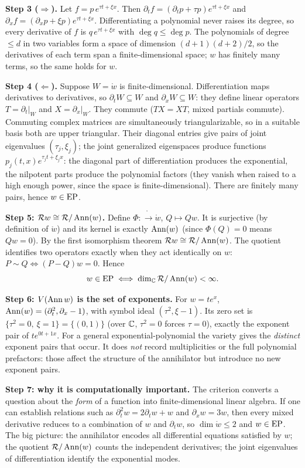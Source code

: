 \medskip\textbf{Step 3 ($\Rightarrow$).} Let $f=p\,e^{\tau t+\xi x}$. Then $\partial_tf=(\partial_tp+\tau p)e^{\tau t+\xi x}$ and $\partial_xf=(\partial_xp+\xi p)e^{\tau t+\xi x}$. Differentiating a polynomial never raises its degree, so every derivative of $f$ is $q\,e^{\tau t+\xi x}$ with $\deg q\le\deg p$. The polynomials of degree $\le d$ in two variables form a space of dimension $(d+1)(d+2)/2$, so the derivatives of each term span a finite-dimensional space; $w$ has finitely many terms, so the same holds for $w$.

\medskip\textbf{Step 4 ($\Leftarrow$).} Suppose $W=\ring w$ is finite-dimensional. Differentiation maps derivatives to derivatives, so $\partial_tW\subseteq W$ and $\partial_xW\subseteq W$: they define linear operators $T=\partial_t|_W$ and $X=\partial_x|_W$. They commute ($TX=XT$, mixed partials commute). Commuting complex matrices are simultaneously triangularizable, so in a suitable basis both are upper triangular. Their diagonal entries give pairs of joint eigenvalues $(\tau_j,\xi_j)$; the joint generalized eigenspaces produce functions $p_j(t,x)e^{\tau_jt+\xi_jx}$: the diagonal part of differentiation produces the exponential, the nilpotent parts produce the polynomial factors (they vanish when raised to a high enough power, since the space is finite-dimensional). There are finitely many pairs, hence $w\in\mathrm{EP}$.

\medskip\textbf{Step 5: $\mathcal{R} w\cong\mathcal{R}/\operatorname{Ann}(w)$.} Define $\Phi:\ring\to\ring w$, $Q\mapsto Qw$. It is surjective (by definition of $\ring w$) and its kernel is exactly $\operatorname{Ann}(w)$ (since $\Phi(Q)=0$ means $Qw=0$). By the first isomorphism theorem $\mathcal{R} w\cong\mathcal{R}/\operatorname{Ann}(w)$. The quotient identifies two operators exactly when they act identically on $w$: $P\sim Q\iff(P-Q)w=0$. Hence
\[
w\in\mathrm{EP}\iff\dim_{\mathbb{C}}\mathcal{R}/\operatorname{Ann}(w)<\infty .
\]

\medskip\textbf{Step 6: $V(\operatorname{Ann} w)$ is the set of exponents.} For $w=te^x$, $\operatorname{Ann}(w)=(\partial_t^2,\partial_x-1)$, with symbol ideal $(\tau^2,\xi-1)$. Its zero set is $\{\tau^2=0,\ \xi=1\}=\{(0,1)\}$ (over $\mathbb{C}$, $\tau^2=0$ forces $\tau=0$), exactly the exponent pair of $te^{0t+1x}$. For a general exponential-polynomial the variety gives the \emph{distinct} exponent pairs that occur. It does \emph{not} record multiplicities or the full polynomial prefactors: those affect the structure of the annihilator but introduce no new exponent pairs.

\medskip\textbf{Step 7: why it is computationally important.} The criterion converts a question about the \emph{form} of a function into finite-dimensional linear algebra. If one can establish relations such as $\partial_t^2w=2\partial_tw+w$ and $\partial_xw=3w$, then every mixed derivative reduces to a combination of $w$ and $\partial_tw$, so $\dim\ring w\le2$ and $w\in\mathrm{EP}$. The big picture: the annihilator encodes all differential equations satisfied by $w$; the quotient $\mathcal{R}/\operatorname{Ann}(w)$ counts the independent derivatives; the joint eigenvalues of differentiation identify the exponential modes.

